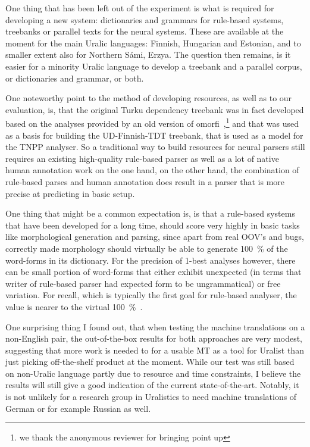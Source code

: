 \documentclass[a4paper,notitlepage]{article}
\begin{document}
One thing that has been left out of the experiment is what is required for
developing a new system: dictionaries and grammars for rule-based systems,
treebanks or parallel texts for the neural systems. These are available at the
moment for the main Uralic languages: Finnish, Hungarian and Estonian, and to
smaller extent also for Northern Sámi, Erzya. The question then remains, is it
easier for a minority Uralic language to develop a treebank and a parallel
corpus, or dictionaries and grammar, or both.

One noteworthy point to the method of developing resources, as well as to our
evaluation, is, that the original Turku dependency treebank was in fact
developed based on the analyses provided by an old version of
omorfi~\cite{haverinen2014building},\footnote{we thank the anonymous reviewer
for bringing point up} and that was used as a basis for building the
UD-Finnish-TDT treebank, that is used as a model for the TNPP analyser. So a
traditional way to build resources for neural parsers still requires an existing
high-quality rule-based parser as well as a lot of native human annotation work
on the one hand, on the other hand, the combination of rule-based parses and
human annotation does result in a parser that is more precise at predicting in
basic setup.

One thing that might be a common expectation is, is that a rule-based systems
that have been developed for a long time, should score very highly in basic
tasks like morphological generation and parsing, since apart from real OOV's and
bugs, correctly made morphology should virtually be able to generate 100~\% of
the word-forms in its dictionary. For the precision of 1-best analyses however,
there can be small portion of word-forms that either exhibit unexpected (in
terms that writer of rule-based parser had expected form to be ungrammatical)
or free variation. For recall, which is typically the first goal for rule-based
analyser, the value is nearer to the virtual 100~\%~\citep{omorfi}.

One surprising thing I found out, that when testing the machine translations on
a non-English pair, the out-of-the-box results for both approaches are very
modest, suggesting that more work is needed to for a usable MT as a tool for
Uralist than just picking off-the-shelf product at the moment. While our test
was still based on non-Uralic language partly due to resource and time
constraints, I believe the results will still give a good indication of the
current state-of-the-art. Notably, it is not unlikely for a research group in
Uralistics to need machine translations of German or for example Russian as
well.
\end{document}
